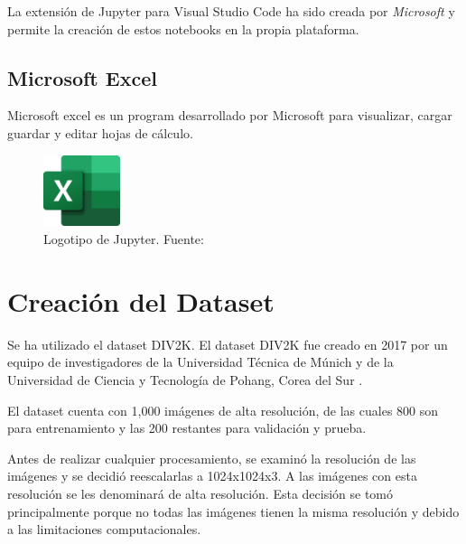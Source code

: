 La extensión de Jupyter para Visual Studio Code ha sido creada por \textit{Microsoft} y permite la creación de estos notebooks en la propia plataforma.

\subsection{Microsoft Excel}

Microsoft excel es un program desarrollado por Microsoft para visualizar, cargar guardar y editar hojas de cálculo\cite{excel_microsoft}.

\begin{figure}[H]
	\centering
	\includegraphics[width=0.2\textwidth]{figures/excellogo.png}
	\caption{\label{fig:excellogo}Logotipo de Jupyter. Fuente: \cite{excel_wikipedia}}
\end{figure}


\section{Creación del Dataset}

\quad Se ha utilizado el dataset DIV2K. El dataset DIV2K fue creado en 2017 por un equipo de investigadores de la Universidad Técnica de Múnich y de la Universidad de Ciencia y Tecnología de Pohang, Corea del Sur \cite{Agustsson_2017_CVPR_Workshops,8014884}.

El dataset cuenta con 1,000 imágenes de alta resolución, de las cuales 800 son para entrenamiento y las 200 restantes para validación y prueba.

Antes de realizar cualquier procesamiento, se examinó la resolución de las imágenes y se decidió reescalarlas a 1024x1024x3. A las imágenes con esta resolución se les denominará de alta resolución. Esta decisión se tomó principalmente porque no todas las imágenes tienen la misma resolución y debido a las limitaciones computacionales.

